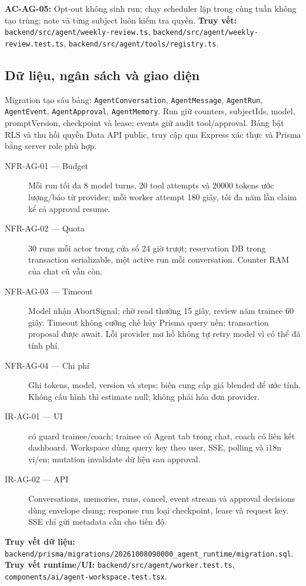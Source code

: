 \documentclass[12pt,a4paper]{article}
\newcommand{\code}[1]{\texttt{#1}}
\newcommand{\evidence}[1]{{\small\nolinkurl{#1}}}
\begin{document}
\textbf{AC-AG-05:} Opt-out không sinh run; chạy scheduler lặp trong cùng tuần không tạo trùng; note và từng subject luôn kiểm tra quyền. \textbf{Truy vết:} \evidence{backend/src/agent/weekly-review.ts}, \evidence{backend/src/agent/weekly-review.test.ts}, \evidence{backend/src/agent/tools/registry.ts}.

\subsection{Dữ liệu, ngân sách và giao diện}
Migration tạo sáu bảng: \code{AgentConversation}, \code{AgentMessage}, \code{AgentRun}, \code{AgentEvent}, \code{AgentApproval}, \code{AgentMemory}. Run giữ counters, subjectIds, model, promptVersion, checkpoint và lease; events giữ audit tool/approval. Bảng bật RLS và thu hồi quyền Data API public, truy cập qua Express xác thực và Prisma bằng server role phù hợp.

\begin{description}
  \item[NFR-AG-01 --- Budget] Mỗi run tối đa 8 model turns, 20 tool attempts và 20000 tokens ước lượng/báo từ provider; mỗi worker attempt 180 giây, tối đa năm lần claim kể cả approval resume.
  \item[NFR-AG-02 --- Quota] 30 runs mỗi actor trong cửa sổ 24 giờ trượt; reservation DB trong transaction serializable, một active run mỗi conversation. Counter RAM của chat cũ vẫn còn.
  \item[NFR-AG-03 --- Timeout] Model nhận AbortSignal; chờ read thường 15 giây, review năm trainee 60 giây. Timeout không cưỡng chế hủy Prisma query nền; transaction proposal được await. Lỗi provider mơ hồ không tự retry model vì có thể đã tính phí.
  \item[NFR-AG-04 --- Chi phí] Ghi tokens, model, version và steps; biến  cung cấp giá blended để ước tính. Không cấu hình thì estimate null; không phải hóa đơn provider.
  \item[IR-AG-01 --- UI]  có guard trainee/coach; trainee có Agent tab trong chat, coach có liên kết dashboard. Workspace dùng query key theo user, SSE, polling và i18n vi/en; mutation invalidate dữ liệu sau approval.
  \item[IR-AG-02 --- API] Conversations, memories, runs, cancel, event stream và approval decisions dùng envelope chung; response run loại checkpoint, lease và request key. SSE chỉ gửi metadata cần cho tiến độ.
\end{description}
\textbf{Truy vết dữ liệu:} \evidence{backend/prisma/migrations/20261008090000_agent_runtime/migration.sql}. \textbf{Truy vết runtime/UI:} \evidence{backend/src/agent/worker.test.ts}, \evidence{components/ai/agent-workspace.test.tsx}.
\end{document}
